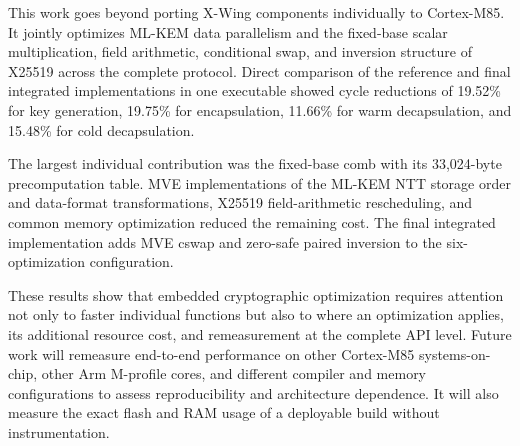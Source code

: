 \documentclass[runningheads,orivec]{llncs}
\newcommand{\xwing}{X-Wing}
\begin{document}
This work goes beyond porting \xwing{} components individually to Cortex-M85.
It jointly optimizes ML-KEM data parallelism and the fixed-base scalar
multiplication, field arithmetic, conditional swap, and inversion structure of
X25519 across the complete protocol. Direct comparison of the reference and
final integrated implementations in one executable showed cycle reductions of
19.52\% for key generation, 19.75\% for encapsulation, 11.66\% for warm
decapsulation, and 15.48\% for cold decapsulation.

The largest individual contribution was the fixed-base comb with its
33,024-byte precomputation table. MVE implementations of the ML-KEM NTT storage
order and data-format transformations, X25519 field-arithmetic rescheduling, and
common memory optimization reduced the remaining cost. The final integrated
implementation adds MVE cswap and zero-safe paired inversion to the
six-optimization configuration.

These results show that embedded cryptographic optimization requires attention
not only to faster individual functions but also to where an optimization
applies, its additional resource cost, and remeasurement at the complete API
level. Future work will remeasure end-to-end performance on other Cortex-M85
systems-on-chip, other Arm M-profile cores, and different compiler and memory
configurations to assess reproducibility and architecture dependence. It will
also measure the exact flash and RAM usage of a deployable build without
instrumentation.



\end{document}
